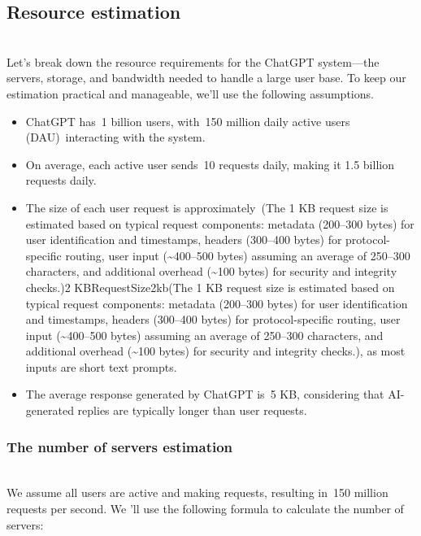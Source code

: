 \subsection{Resource estimation}\label{at_T27Z9YYbh6QA8Prz04}
\\
Let's break down the resource requirements for the ChatGPT system---the servers, storage, and bandwidth needed to handle a large user base. To keep our estimation practical and manageable, we'll use the following assumptions.

\begin{itemize}
\item
\protect{}\label{y-7DOcrw778t_neuN26Rz}
ChatGPT has~1 billion users, with~150 million daily active users (DAU)~interacting with the system.
\item
\protect{}\label{uVauik7xf4QhJrOju60eN}
On average, each active user sends~10 requests daily, making it 1.5 billion requests daily.
\item
\protect{}\label{u3nmgQVhSfKq0383BrSM9}
The size of each user request is approximately~(The 1 KB request size is estimated based on typical request components: metadata (200--300 bytes) for user identification and timestamps, headers (300--400 bytes) for protocol-specific routing, user input (\textasciitilde400--500 bytes) assuming an average of 250--300 characters, and additional overhead (\textasciitilde100 bytes) for security and integrity checks.)2 KBRequestSize2kb(The 1 KB request size is estimated based on typical request components: metadata (200--300 bytes) for user identification and timestamps, headers (300--400 bytes) for protocol-specific routing, user input (\textasciitilde400--500 bytes) assuming an average of 250--300 characters, and additional overhead (\textasciitilde100 bytes) for security and integrity checks.), as most inputs are short text prompts.
\item
\protect{}\label{roNjPKc0zUMu2QViI5hBN}
The average response generated by ChatGPT is~5 KB, considering that AI-generated replies are typically longer than user requests.
\end{itemize}

\subsubsection{The number of servers estimation}\label{Jw1sa16nhhHyq5arKSxpg}
\\
We assume all users are active and making requests, resulting in~150 million requests per second. We 'll use the following formula to calculate the number of servers:

